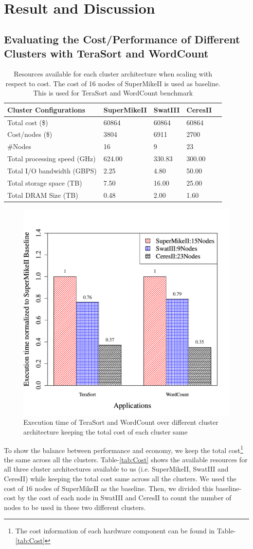 \documentclass[journal]{IEEEtran}
\begin{document}
\section{Result and Discussion} \label{sec:Result}
\subsection{Evaluating the Cost/Performance of Different Clusters with TeraSort and WordCount}
\begin{table}[!t]
\caption{Resources available for each cluster architecture when scaling with respect to cost. The cost of 16 nodes of SuperMikeII is used as baseline. This is used for TeraSort and WordCount benchmark}
\label{tab:ScalingCost}
\label{fig:perf}
\centering
\begin{tabular}{|p{2.5cm}|p{1.5cm}|p{1.5cm}|p{1.5cm}|p{1.5cm}|} \hline
Cluster Configurations & SuperMikeII & SwatIII & CeresII\\ \hline
Total cost (\$) & 60864 & 60864 & 60864\\ \hline
Cost/nodes (\$) & 3804 & 6911 & 2700\\ \hline
\#Nodes & 16 & 9 & 23\\ \hline
Total processing speed (GHz) & 624.00 & 330.83 & 300.00\\ \hline
Total I/O bandwidth (GBPS) & 2.25 & 4.80 & 50.00\\ \hline
Total storage space (TB) & 7.50 & 16.00 & 25.00\\ \hline
Total DRAM Size (TB) & 0.48 & 2.00 & 1.60\\ \hline
\end{tabular}
\end{table}
\begin{figure}[!t]
\centering
\includegraphics[width=.5\textwidth]{Figures/PerformanceFigures/execTimeTnW.pdf}
\caption{Execution time of TeraSort and WordCount over different cluster architecture keeping the total cost of each cluster same}
\end{figure}
To show the balance between performance and economy, we keep the total cost\footnote{The cost information of each hardware component can be found in Table-\ref{tab:Cost}} the same across all the clusters. Table-\ref{tab:Cost} shows the available resources for all three cluster architectures available to us (i.e. SuperMikeII, SwatIII and CeresII) while keeping the total cost same across all the clusters. We used the cost of $16$ nodes of SuperMikeII as the baseline. Then, we divided this baseline-cost by the cost of each node in SwatIII and CeresII to count the number of nodes to be used in these two different clusters.
\end{document}
